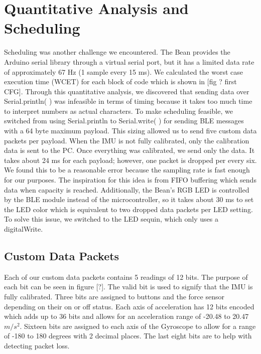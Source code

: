 \documentclass[12pt,journal]{IEEEtran}
\begin{document}
\section{Quantitative Analysis and Scheduling}
Scheduling was another challenge we encountered. The Bean provides the Arduino serial library through a virtual serial port, but it has a limited data rate of approximately 67 Hz (1 sample every 15 ms). We calculated the worst case execution time (WCET) for each block of code which is shown in [fig ? first CFG]. Through this quantitative analysis, we discovered that sending data over Serial.println( ) was infeasible in terms of timing because it takes too much time to interpret numbers as actual characters.
   To make scheduling feasible, we switched from using Serial.println to Serial.write( ) for sending BLE messages with a 64 byte maximum payload. This sizing allowed us to send five custom data packets per payload. When the IMU is not fully calibrated, only the calibration data is sent to the PC. Once everything was calibrated, we send only the data. It takes about 24 ms for each payload; however, one packet is dropped per every six. We found this to be a reasonable error because the sampling rate is fast enough for our purposes. The inspiration for this idea is from FIFO buffering which sends data when capacity is reached.
  Additionally, the Bean’s RGB LED is controlled by the BLE module instead of the microcontroller, so it takes about 30 ms to set the LED color which is equivalent to two dropped data packets per LED setting. To solve this issue, we switched to the LED sequin, which only uses a digitalWrite. 

\subsection{Custom Data Packets}
Each of our custom data packets contains 5 readings of 12 bits. The purpose of each bit can be seen in figure [?]. The valid bit is used to signify that the IMU is fully calibrated. Three bits are assigned to buttons and the force sensor depending on their on or off status. Each axis of acceleration has 12 bits encoded which adds up to 36 bits and allows for an acceleration range of -20.48 to 20.47 $m/s^2$. Sixteen bits are assigned to each axis of the Gyroscope to allow for a range of -180 to 180 degrees with 2 decimal places. The last eight bits are to help with detecting packet loss.
\end{document}
